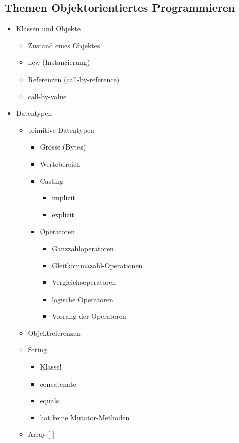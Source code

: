\subsection{Themen Objektorientiertes Programmieren}
\begin{itemize}
    \item Klassen und Objekte
    \begin{itemize}
        \item Zustand eines Objektes
        \item new (Instanzierung)
        \item Referenzen (call-by-reference)
        \item call-by-value
    \end{itemize}
    
    \item Datentypen
    \begin{itemize}
        \item primitive Datentypen
        \begin{itemize}
            \item Grösse (Bytes)
            \item Wertebereich
            \item Casting
            \begin{itemize}
                \item implizit
                \item explizit
            \end{itemize}
            \item Operatoren
            \begin{itemize}
                \item Ganzzahloperatoren
                \item Gleitkommazahl-Operationen
                \item Vergleichsoperatoren
                \item logische Operatoren
                \item Vorrang der Operatoren
            \end{itemize}
        \end{itemize}
        \item Objektreferenzen
        \item String
        \begin{itemize}
            \item Klasse!
            \item concatenate
            \item equals
            \item hat keine Mutator-Methoden
        \end{itemize} 
        \item Array [ ]  
    \end{itemize}
    

\end{itemize}
